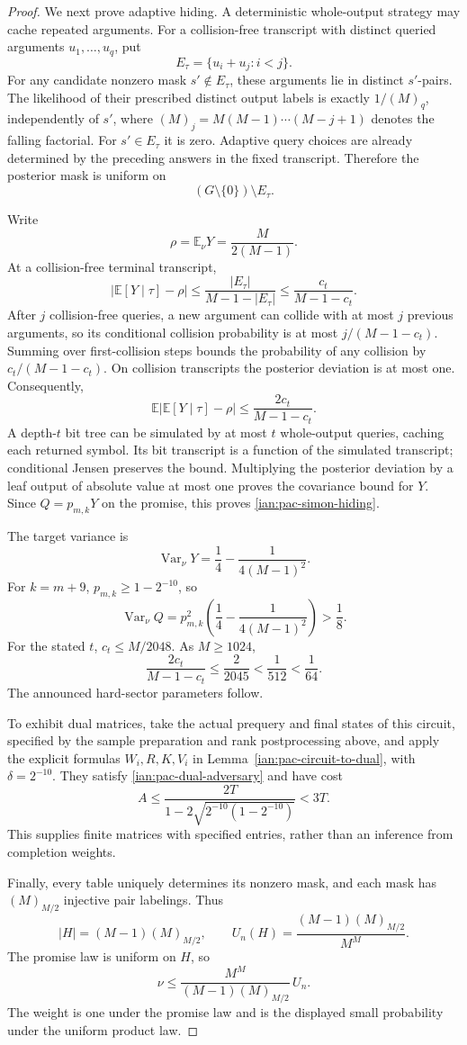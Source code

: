 \begin{proof}
We next prove adaptive hiding.
A deterministic whole-output strategy may cache repeated arguments.
For a collision-free transcript with distinct queried arguments
\(u_1,\ldots,u_q\), put
\[
 E_\tau=\{u_i+u_j:i<j\}.
\]
For any candidate nonzero mask \(s'\notin E_\tau\), these arguments
lie in distinct \(s'\)-pairs. The likelihood of their prescribed
distinct output labels is exactly \(1/(M)_q\), independently of
\(s'\), where \((M)_j=M(M-1)\cdots(M-j+1)\) denotes the falling factorial. For \(s'\in E_\tau\) it is zero.
Adaptive query choices are already determined by the preceding
answers in the fixed transcript. Therefore the posterior mask is
uniform on
\[
 (G\setminus\{0\})\setminus E_\tau.
\]

Write
\[
 \rho=\mathbb E_\nu Y=\frac{M}{2(M-1)}.
\]
At a collision-free terminal transcript,
\[
 |\mathbb E[Y\mid\tau]-\rho|
 \le\frac{|E_\tau|}{M-1-|E_\tau|}
 \le\frac{c_t}{M-1-c_t}.
\]
After \(j\) collision-free queries, a new argument can collide with
at most \(j\) previous arguments, so its conditional collision
probability is at most \(j/(M-1-c_t)\).
Summing over first-collision steps bounds the probability of any
collision by \(c_t/(M-1-c_t)\).
On collision transcripts the posterior deviation is at most one.
Consequently,
\[
 \mathbb E|\mathbb E[Y\mid\tau]-\rho|
 \le\frac{2c_t}{M-1-c_t}.
\]
A depth-\(t\) bit tree can be simulated by at most \(t\)
whole-output queries, caching each returned symbol.
Its bit transcript is a function of the simulated transcript;
conditional Jensen preserves the bound.
Multiplying the posterior deviation by a leaf output of absolute
value at most one proves the covariance bound for \(Y\).
Since \(Q=p_{m,k}Y\) on the promise, this proves
\eqref{ian:pac-simon-hiding}.

The target variance is
\[
 \operatorname{Var}_\nu Y
   =\frac14-\frac1{4(M-1)^2}.
\]
For \(k=m+9\), \(p_{m,k}\ge1-2^{-10}\), so
\[
 \operatorname{Var}_\nu Q
   =p_{m,k}^2
       \left(\frac14-\frac1{4(M-1)^2}\right)>\frac18.
\]
For the stated \(t\), \(c_t\le M/2048\).
As \(M\ge1024\),
\[
 \frac{2c_t}{M-1-c_t}
 \le\frac2{2045}<\frac1{512}<\frac1{64}.
\]
The announced hard-sector parameters follow.

To exhibit dual matrices, take the actual prequery and final
states of this circuit, specified by the sample preparation and
rank postprocessing above, and apply the explicit formulas
\(W_i,R,K,V_i\) in Lemma~\ref{ian:pac-circuit-to-dual}, with
\(\delta=2^{-10}\).
They satisfy \eqref{ian:pac-dual-adversary} and have cost
\[
 A\le
 \frac{2T}{1-2\sqrt{2^{-10}(1-2^{-10})}}<3T.
\]
This supplies finite matrices with specified entries, rather than
an inference from completion weights.

Finally, every table uniquely determines its nonzero mask, and
each mask has \((M)_{M/2}\) injective pair labelings. Thus
\[
 |H|=(M-1)(M)_{M/2},\qquad
 U_n(H)=\frac{(M-1)(M)_{M/2}}{M^M}.
\]
The promise law is uniform on \(H\), so
\[
 \nu\le
 \frac{M^M}{(M-1)(M)_{M/2}}\,U_n.
\]
The weight is one under the promise law and is the displayed
small probability under the uniform product law.
\end{proof}

